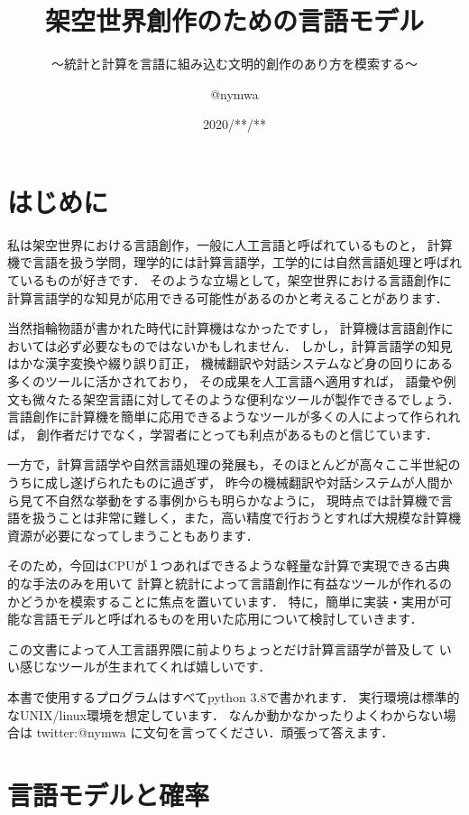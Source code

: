 \documentclass[11pt]{report}
\title{架空世界創作のための言語モデル}
\subtitle{〜統計と計算を言語に組み込む文明的創作のあり方を模索する〜}
\author{@nymwa}
\date{2020/**/**}
\begin{document}
\maketitle

\renewcommand{\contentsname}{目次}
\tableofcontents

\chapter{はじめに}

私は架空世界における言語創作，一般に人工言語と呼ばれているものと，
計算機で言語を扱う学問，理学的には計算言語学，工学的には自然言語処理と呼ばれているものが好きです．
そのような立場として，架空世界における言語創作に計算言語学的な知見が応用できる可能性があるのかと考えることがあります．

当然指輪物語が書かれた時代に計算機はなかったですし，
計算機は言語創作においては必ず必要なものではないかもしれません．
しかし，計算言語学の知見はかな漢字変換や綴り誤り訂正，
機械翻訳や対話システムなど身の回りにある多くのツールに活かされており，
その成果を人工言語へ適用すれば，
語彙や例文も微々たる架空言語に対してそのような便利なツールが製作できるでしょう．
言語創作に計算機を簡単に応用できるようなツールが多くの人によって作られれば，
創作者だけでなく，学習者にとっても利点があるものと信じています．

一方で，計算言語学や自然言語処理の発展も，そのほとんどが高々ここ半世紀のうちに成し遂げられたものに過ぎず，
昨今の機械翻訳や対話システムが人間から見て不自然な挙動をする事例からも明らかなように，
現時点では計算機で言語を扱うことは非常に難しく，また，高い精度で行おうとすれば大規模な計算機資源が必要になってしまうこともあります．

そのため，今回はCPUが１つあればできるような軽量な計算で実現できる古典的な手法のみを用いて
計算と統計によって言語創作に有益なツールが作れるのかどうかを模索することに焦点を置いています．
特に，簡単に実装・実用が可能な言語モデルと呼ばれるものを用いた応用について検討していきます．

この文書によって人工言語界隈に前よりちょっとだけ計算言語学が普及して
いい感じなツールが生まれてくれば嬉しいです．

本書で使用するプログラムはすべてpython 3.8で書かれます．
実行環境は標準的なUNIX/linux環境を想定しています．
なんか動かなかったりよくわからない場合は twitter:@nymwa に文句を言ってください．頑張って答えます．

\chapter{言語モデルと確率}
\end{document}
